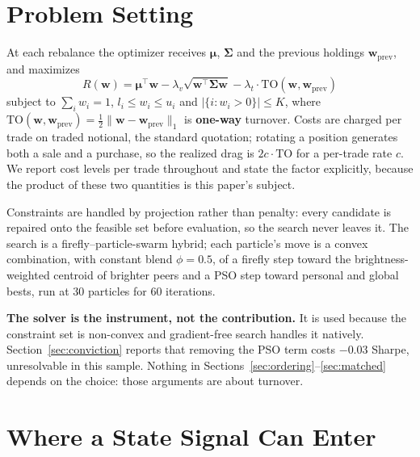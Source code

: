 \documentclass[sigconf,anonymous,review]{acmart}
\begin{document}
\section{Problem Setting}

At each rebalance the optimizer receives $\boldsymbol{\mu}$, $\boldsymbol{\Sigma}$
and the previous holdings $\mathbf{w}_{\mathrm{prev}}$, and maximizes
\begin{equation}
R(\mathbf{w}) = \boldsymbol{\mu}^\top \mathbf{w}
- \lambda_v \sqrt{\mathbf{w}^\top \boldsymbol{\Sigma}\mathbf{w}}
- \lambda_t \cdot \mathrm{TO}(\mathbf{w}, \mathbf{w}_{\mathrm{prev}})
\end{equation}
subject to $\sum_i w_i = 1$, $l_i \le w_i \le u_i$ and
$|\{i : w_i > 0\}| \le K$, where
$\mathrm{TO}(\mathbf{w},\mathbf{w}_{\mathrm{prev}}) =
\tfrac{1}{2}\lVert \mathbf{w}-\mathbf{w}_{\mathrm{prev}}\rVert_1$
is \textbf{one-way} turnover. Costs are charged per trade on traded notional, the
standard quotation; rotating a position generates both a sale and a purchase, so
the realized drag is $2c\cdot\mathrm{TO}$ for a per-trade rate $c$. We report cost
levels per trade throughout and state the factor explicitly, because the product of
these two quantities is this paper's subject.

Constraints are handled by projection rather than penalty: every candidate is
repaired onto the feasible set before evaluation, so the search never leaves it.
The search is a firefly--particle-swarm hybrid; each particle's move is a convex
combination, with constant blend $\phi = 0.5$, of a firefly step toward the
brightness-weighted centroid of brighter peers and a PSO step toward personal and
global bests, run at 30 particles for 60 iterations.

\textbf{The solver is the instrument, not the contribution.} It is used because the
constraint set is non-convex and gradient-free search handles it natively.
Section~\ref{sec:conviction} reports that removing the PSO term costs $-0.03$
Sharpe, unresolvable in this sample. Nothing in
Sections~\ref{sec:ordering}--\ref{sec:matched} depends on the choice: those
arguments are about turnover.

\section{Where a State Signal Can Enter}
\end{document}
